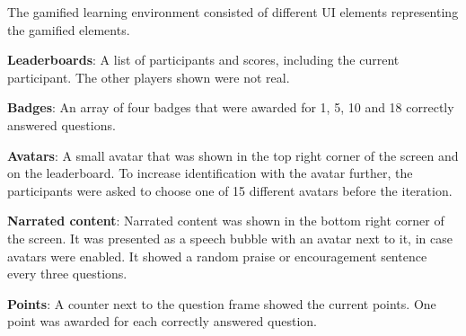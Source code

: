The gamified learning environment consisted of different UI elements representing the gamified elements.
\begin{APAitemize}
  \item \textbf{Leaderboards}: A list of participants and scores, including the current participant. The other players shown were not real.
  \item \textbf{Badges}: An array of four badges that were awarded for 1, 5, 10 and 18 correctly answered questions.
  \item \textbf{Avatars}: A small avatar that was shown in the top right corner of the screen and on the leaderboard. To increase identification with the avatar further, the participants were asked to choose one of 15 different avatars before the iteration.
  \item \textbf{Narrated content}: Narrated content was shown in the bottom right corner of the screen. It was presented as a speech bubble with an avatar next to it, in case avatars were enabled. It showed a random praise or encouragement sentence every three questions.
  \item \textbf{Points}: A counter next to the question frame showed the current points. One point was awarded for each correctly answered question.
\end{APAitemize}

